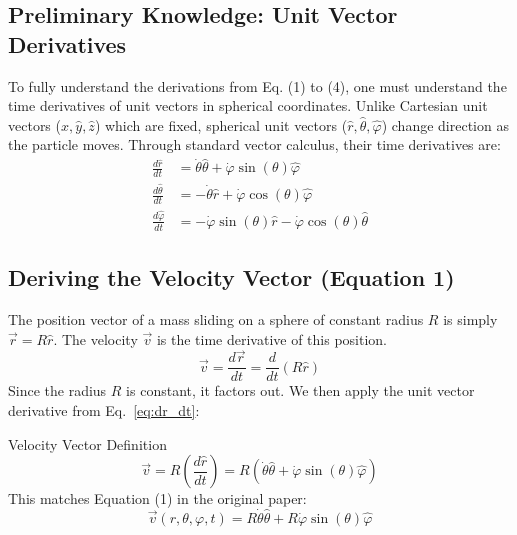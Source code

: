 \documentclass[11pt,letterpaper]{article}
\begin{document}
\subsection{Preliminary Knowledge: Unit Vector Derivatives}
To fully understand the derivations from Eq. (1) to (4), one must understand the time derivatives of unit vectors in spherical coordinates. Unlike Cartesian unit vectors ($\hat{x}, \hat{y}, \hat{z}$) which are fixed, spherical unit vectors ($\hat{r}, \hat{\theta}, \hat{\varphi}$) change direction as the particle moves. Through standard vector calculus, their time derivatives are:
\begin{align}
\frac{d\hat{r}}{dt} &= \dot{\theta}\hat{\theta} + \dot{\varphi}\sin(\theta)\hat{\varphi} \label{eq:dr_dt} \\
\frac{d\hat{\theta}}{dt} &= -\dot{\theta}\hat{r} + \dot{\varphi}\cos(\theta)\hat{\varphi} \label{eq:dtheta_dt} \\
\frac{d\hat{\varphi}}{dt} &= -\dot{\varphi}\sin(\theta)\hat{r} - \dot{\varphi}\cos(\theta)\hat{\theta} \label{eq:dphi_dt}
\end{align}

\subsection{Deriving the Velocity Vector (Equation 1)}
The position vector of a mass sliding on a sphere of constant radius $R$ is simply $\vec{r} = R\hat{r}$. The velocity $\vec{v}$ is the time derivative of this position.
\begin{equation}
\vec{v} = \frac{d\vec{r}}{dt} = \frac{d}{dt}(R\hat{r})
\end{equation}
Since the radius $R$ is constant, it factors out. We then apply the unit vector derivative from Eq.~\eqref{eq:dr_dt}:
\begin{equationbreakdown}{Velocity Vector Definition}
\begin{equation*}
\vec{v} = R\left(\frac{d\hat{r}}{dt}\right) = R(\dot{\theta}\hat{\theta} + \dot{\varphi}\sin(\theta)\hat{\varphi})
\end{equation*}
This matches Equation (1) in the original paper:
\begin{equation}\label{eq:velocity}
\vec{v}(r,\theta,\varphi,t) = R\dot{\theta}\hat{\theta} + R\dot{\varphi}\sin(\theta)\hat{\varphi}
\end{equation}
\end{equationbreakdown}
\end{document}
